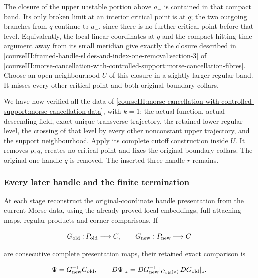 The closure of the upper unstable portion above \(a_-\) is contained in that compact band. Its only broken limit at an interior critical point is at \(q\); the two outgoing branches from \(q\) continue to \(a_-\), since there is no further critical point before that level. Equivalently, the local linear coordinates at \(q\) and the compact hitting-time argument away from its small meridian give exactly the closure described in \cref{courseIII:framed-handle-slides-and-index-one-removal:section-3} of \cref{courseIII:morse-cancellation-with-controlled-support:morse-cancellation-fibres}. Choose an open neighbourhood \(U\) of this closure in a slightly larger regular band. It misses every other critical point and both original boundary collars.

We have now verified all the data of \cref{courseIII:morse-cancellation-with-controlled-support:morse-cancellation-data}, with \(k=1\): the actual function, actual descending field, exact unique transverse trajectory, the retained lower regular level, the crossing of that level by every other nonconstant upper trajectory, and the support neighbourhood. Apply its complete cutoff construction inside \(U\). It removes \(p,q\), creates no critical point and fixes the original boundary collars. The original one-handle \(q\) is removed. The inserted three-handle \(r\) remains.

\subsubsection{Every later handle and the finite termination}
\label{courseIII:framed-handle-slides-and-index-one-removal:section-7.3}

At each stage reconstruct the original-coordinate handle presentation from the current Morse data, using the already proved local embeddings, full attaching maps, regular products and corner comparisons. If

\begin{equation}
G_{\rm old}:P_{\rm old}\longrightarrow C,\qquad
 G_{\rm new}:P_{\rm new}\longrightarrow C
 \label{courseIII:framed-handle-slides-and-index-one-removal:eq:7.13}
\end{equation}

are consecutive complete presentation maps, their retained exact comparison is

\begin{equation}
\Psi=G_{\rm new}^{-1}G_{\rm old},\qquad
 D\Psi|_z
  =D G_{\rm new}^{-1}|_{G_{\rm old}(z)}\,DG_{\rm old}|_z .
 \label{courseIII:framed-handle-slides-and-index-one-removal:eq:7.14}
\end{equation}

